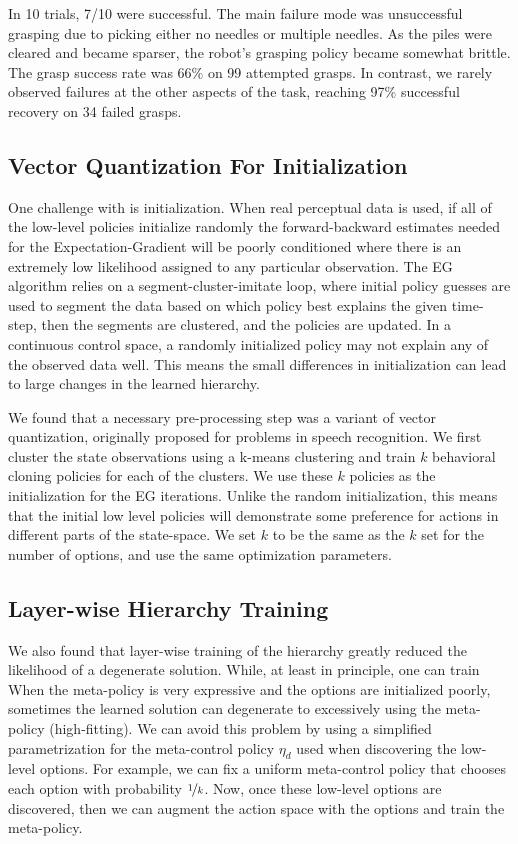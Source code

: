 In 10 trials, 7/10 were successful. The main failure mode was unsuccessful grasping due to picking either no needles or multiple needles. As the piles were cleared and became sparser, the robot's grasping policy became somewhat brittle. The grasp success rate was 66\% on 99 attempted grasps. In contrast, we rarely observed failures at the other aspects of the task, reaching 97\% successful recovery on 34 failed grasps. 


\subsection*{Vector Quantization For Initialization}
One challenge with \alg is initialization.
When real perceptual data is used, if all of the low-level policies initialize randomly the forward-backward estimates needed for the Expectation-Gradient will be poorly conditioned where there is an extremely low likelihood assigned to any particular observation.
The EG algorithm relies on a segment-cluster-imitate loop, where initial policy guesses are used to segment the data based on which policy best explains the given time-step, then the segments are clustered, and the policies are updated.
In a continuous control space, a randomly initialized policy may not explain any of the observed data well.
This means the small differences in initialization can lead to large changes in the learned hierarchy.

We found that a necessary pre-processing step was a variant of vector quantization, originally proposed for problems in speech recognition. 
We first cluster the state observations using a \textsf{k-means} clustering and train $k$ behavioral cloning policies for each of the clusters.
We use these $k$ policies as the initialization for the EG iterations.
Unlike the random initialization, this means that the initial low level policies will demonstrate some preference for actions in different parts of the state-space.
We set $k$ to be the same as the $k$ set for the number of options, and use the same optimization parameters.

\subsection*{Layer-wise Hierarchy Training}
We also found that layer-wise training of the hierarchy greatly reduced the likelihood of a degenerate solution.
While, at least in principle, one can train 
When the meta-policy is very expressive and the options are initialized poorly, sometimes the learned solution can degenerate to excessively using the meta-policy (high-fitting). 
We can avoid this problem by using a simplified parametrization for the meta-control policy $\eta_d$ used when discovering the low-level options. For example, we can fix a uniform meta-control policy that chooses each option with probability $\nicefrac 1 {k}$. Now, once these low-level options are discovered, then we can augment the action space with the options and train the meta-policy.

